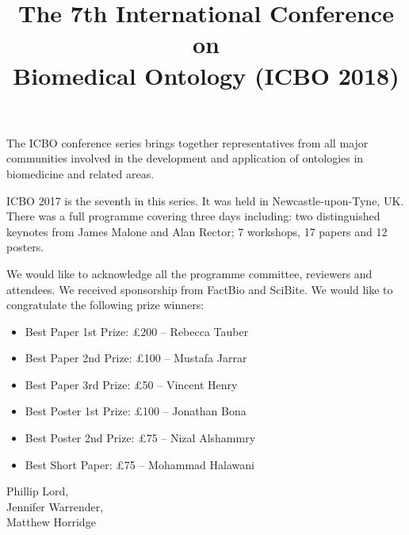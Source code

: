 \documentclass{article}
\title{The 7th International Conference on\\Biomedical Ontology (ICBO 2018)}
\date{}
\begin{document}
\parindent0pt
\parskip20pt
\maketitle

The ICBO conference series brings together representatives from all
major communities involved in the development and application of
ontologies in biomedicine and related areas.

ICBO 2017 is the seventh in this series. It was held in
Newcastle-upon-Tyne, UK. There was a full programme covering three
days including: two distinguished keynotes from James Malone and Alan
Rector; 7 workshops, 17 papers and 12 posters.

We would like to acknowledge all the programme committee, reviewers and
attendees. We received sponsorship from FactBio and SciBite. We would
like to congratulate the following prize winners:

\begin{itemize}
\item Best Paper 1st Prize: £200 -- Rebecca Tauber
\item Best Paper 2nd Prize: £100 -- Mustafa Jarrar
\item Best Paper 3rd Prize: £50 -- Vincent Henry
\item Best Poster 1st Prize: £100 -- Jonathan Bona
\item Best Poster 2nd Prize: £75 -- Nizal Alshammry
\item Best Short Paper: £75 -- Mohammad Halawani
\end{itemize}

Phillip Lord,\\
Jennifer Warrender,\\
Matthew Horridge
\end{document}
